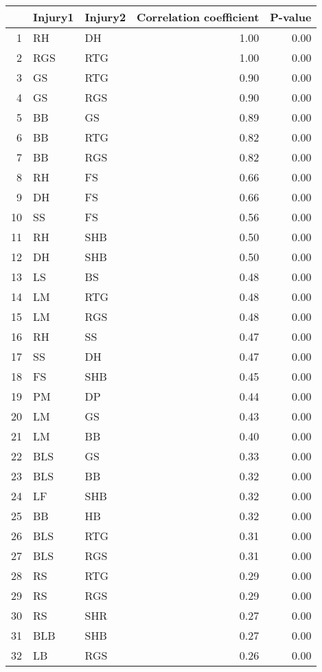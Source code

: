 \begin{table}[ht]
\centering
\begin{tabular}{rllrr}
  \hline
 & Injury1 & Injury2 & Correlation coefficient & P-value \\ 
  \hline
1 & RH & DH & 1.00 & 0.00 \\ 
  2 & RGS & RTG & 1.00 & 0.00 \\ 
  3 & GS & RTG & 0.90 & 0.00 \\ 
  4 & GS & RGS & 0.90 & 0.00 \\ 
  5 & BB & GS & 0.89 & 0.00 \\ 
  6 & BB & RTG & 0.82 & 0.00 \\ 
  7 & BB & RGS & 0.82 & 0.00 \\ 
  8 & RH & FS & 0.66 & 0.00 \\ 
  9 & DH & FS & 0.66 & 0.00 \\ 
  10 & SS & FS & 0.56 & 0.00 \\ 
  11 & RH & SHB & 0.50 & 0.00 \\ 
  12 & DH & SHB & 0.50 & 0.00 \\ 
  13 & LS & BS & 0.48 & 0.00 \\ 
  14 & LM & RTG & 0.48 & 0.00 \\ 
  15 & LM & RGS & 0.48 & 0.00 \\ 
  16 & RH & SS & 0.47 & 0.00 \\ 
  17 & SS & DH & 0.47 & 0.00 \\ 
  18 & FS & SHB & 0.45 & 0.00 \\ 
  19 & PM & DP & 0.44 & 0.00 \\ 
  20 & LM & GS & 0.43 & 0.00 \\ 
  21 & LM & BB & 0.40 & 0.00 \\ 
  22 & BLS & GS & 0.33 & 0.00 \\ 
  23 & BLS & BB & 0.32 & 0.00 \\ 
  24 & LF & SHB & 0.32 & 0.00 \\ 
  25 & BB & HB & 0.32 & 0.00 \\ 
  26 & BLS & RTG & 0.31 & 0.00 \\ 
  27 & BLS & RGS & 0.31 & 0.00 \\ 
  28 & RS & RTG & 0.29 & 0.00 \\ 
  29 & RS & RGS & 0.29 & 0.00 \\ 
  30 & RS & SHR & 0.27 & 0.00 \\ 
  31 & BLB & SHB & 0.27 & 0.00 \\ 
  32 & LB & RGS & 0.26 & 0.00 \\ 

\end{tabular}
\end{table}
